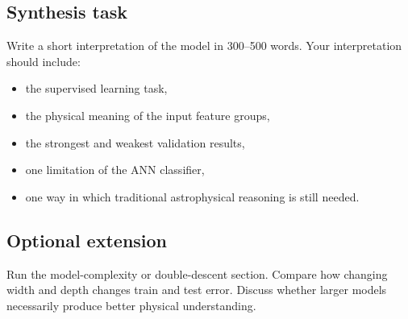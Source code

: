 \subsection*{Synthesis task}
Write a short interpretation of the model in 300--500 words. Your interpretation should include:
\begin{itemize}
    \item the supervised learning task,
    \item the physical meaning of the input feature groups,
    \item the strongest and weakest validation results,
    \item one limitation of the ANN classifier,
    \item one way in which traditional astrophysical reasoning is still needed.
\end{itemize}

\subsection*{Optional extension}
Run the model-complexity or double-descent section. Compare how changing width and depth changes train and test error. Discuss whether larger models necessarily produce better physical understanding.
